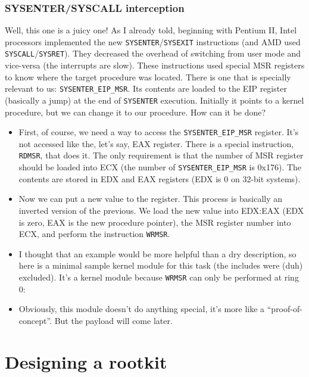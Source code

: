 \documentclass[12pt]{book}
\begin{document}
  \subsection{SYSENTER/SYSCALL interception}
  Well, this one is a juicy one! As I already told, beginning with Pentium II,
  Intel processors implemented the new \verb!SYSENTER!/\verb!SYSEXIT!
  instructions (and AMD used \verb!SYSCALL!/\verb!SYSRET!). They decreased the
  overhead of switching from user mode and vice-versa (the interrupts are
  slow). These instructions used special MSR registers to know where the
  target procedure was located. There is one that is specially relevant to us:
  \verb!SYSENTER_EIP_MSR!. Its contents are loaded to the EIP register
  (basically a jump) at the end of \verb!SYSENTER! execution. Initially it
  points to a kernel procedure, but we can change it to our procedure. How can
  it be done?
  \begin{itemize}
    \item First, of course, we need a way to access the
      \verb!SYSENTER_EIP_MSR! register. It's not accessed like the, let's say,
      EAX register. There is a special instruction, \verb!RDMSR!, that does
      it. The only requirement is that the number of MSR register should be
      loaded into ECX (the number of \verb!SYSENTER_EIP_MSR! is 0x176). The
      contents are stored in EDX and EAX registers (EDX is 0 on 32-bit
      systems).
      
    \item Now we can put a new value to the register. This process is
      basically an inverted version of the previous. We load the new value
      into EDX:EAX (EDX is zero, EAX is the new procedure pointer), the MSR
      register number into ECX, and perform the instruction \verb!WRMSR!.
  
    \item I thought that an example would be more helpful than a dry
      description, so here is a minimal sample kernel module for this task
      (the includes were (duh) excluded). It's a kernel module because
      \verb!WRMSR!  can only be performed at ring 0: 
      
    \item Obviously, this module doesn't do anything special, it's more like a
      ``proof-of-concept''. But the payload will come later.
  \end{itemize}

  \chapter{Designing a rootkit}
  
\end{document}
